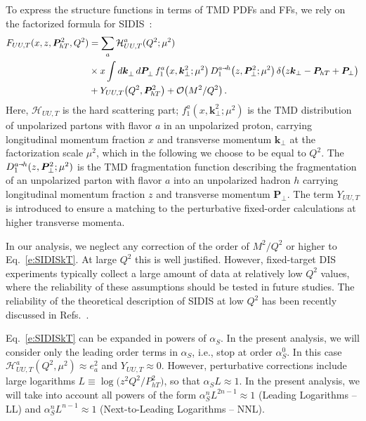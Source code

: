 \documentclass[aps,preprintnumbers,showpacs,nofootinbib,superscriptaddress,floatfix]{revtex4}
\newcommand{\smarrow}{\mbox{\raisebox{-4.5pt}[0pt][0pt]{$\hspace{-1pt} 
		\vec{\phantom{v}}$}}}
\newcommand{\T}{\perp}
\newcommand{\Tperp}{T}
\begin{document}
To express the structure functions in terms of TMD PDFs and FFs, 
we rely on the factorized formula 
for SIDIS~\cite{Collins:1981uk,Collins:1984kg,Ji:2002aa,Ji:2004wu,%
Collins:2011zzd,Aybat:2011zv,GarciaEchevarria:2011rb,Echevarria:2012pw,%
Collins:2012uy}:  
\begin{align}
\label{e:SIDISkT}
   F_{UU,T}(x,z, \bm{P}_{h \Tperp}^2, Q^2) &= \sum_a \mathcal{H}_{UU,T}^{a}(Q^2;\mu^2) \\ 
      &\times x \int d\bm{k}_\T^{} \, d\bm{P}_\T^{} \,  f_1^a\big(x,\bm{k}_{\T}^2; \mu^2 \big) \, D_{1}^{a\smarrow h}\big(z,\bm{P}_{\T}^2; \mu^2 \big) \,
      \delta \big(z {\bm k}_{\T} - {\bm P}_{h \Tperp} + {\bm P}_{\T}\big)
\nonumber\\&
\nonumber + Y_{UU,T}\big(Q^2, \bm{P}_{h\Tperp}^2\big) + \mathcal{O}\big(M^2/Q^2\big) \, .
\end{align} 
Here, $\mathcal{H}_{UU,T}$ is the hard scattering part; $f_1^a(x,\bm{k}_{\T}^2;
\mu^2)$ is the TMD distribution of unpolarized partons with flavor $a$ in an unpolarized
proton, carrying longitudinal momentum fraction $x$ and transverse momentum
$\bm{k}_\T$ at the factorization scale $\mu^2$, which in the following we
choose to be equal to $Q^2$.  The $D_1^{a\smarrow h}(z, \bm{P}_{\T}^2;
\mu^2)$ is the TMD fragmentation function describing the fragmentation of an unpolarized parton with flavor $a$ into
an unpolarized hadron $h$ carrying longitudinal momentum fraction $z$ and
transverse momentum 
$\bm{P}_\T$. The term $Y_{UU,T}$ is introduced to ensure a matching
to the perturbative fixed-order calculations at higher transverse momenta. 

In our analysis, we neglect any correction of the order of $M^2/Q^2$ or higher
to  Eq.~\eqref{e:SIDISkT}.
At large $Q^2$ this is well justified. 
However, fixed-target DIS experiments typically 
collect a large amount of data
at relatively low $Q^2$ values, where the reliability of these assumptions
should be tested in future studies. The reliability
of the theoretical description of SIDIS at low $Q^2$ has been recently
discussed in Refs.~\cite{Boglione:2016bph,Moffat:2017sha}.
 
Eq.~\eqref{e:SIDISkT} can be expanded in powers
of $\alpha_S$. In the present analysis, we 
will consider only the leading order terms in $\alpha_S$, i.e., stop at
order $\alpha_S^0$. In this case 
$\mathcal{H}^a_{UU,T} (Q^2, \mu^2) \approx e_a^2$
and $Y_{UU,T}\approx 0$. 
However, perturbative corrections include large logarithms $L \equiv
\log\big(z^2 Q^2/P_{hT}^2\big)$, so that $\alpha_S L \approx 1$.
In the present analysis, we will take into account all 
powers of the form $\alpha_S^n L^{2n-1} \approx 1$ (Leading Logarithms --LL) 
and 
$\alpha_S^n L^{n-1} \approx 1$ (Next-to-Leading Logarithms -- NNL).
\end{document}
